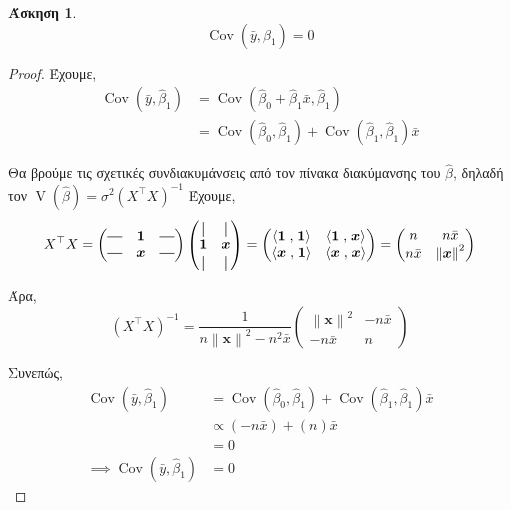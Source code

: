 \documentclass{article}
\DeclareMathOperator{\V}{\mathrm{V}}
\DeclareMathOperator{\Cov}{\mathrm{Cov}}
\newcommand{\inner}[2]{\left\langle #1 \mathrel{,} #2 \right\rangle}
\newcommand{\norm}[1]{\left\| #1 \right\|}
\newcommand{\T}[1]{{#1}^{\top}}  %
\newcommand*{\vertbar}{\rule[-1ex]{0.5pt}{2.5ex}}
\newcommand*{\horzbar}{\rule[.5ex]{2.5ex}{0.5pt}}
\newcommand{\hb}{\hat{\beta}}
\newcommand{\ve}[1]{\boldsymbol{#1}}
\newtheorem{exercise}{Άσκηση}[section]
\begin{document}
\begin{exercise} \label{ex3}
    \begin{equation*}
        \Cov(\bar{y}, \hb_1) = 0
    \end{equation*}
\end{exercise}
\begin{proof}
    Έχουμε,
    \begin{equation*}
    \begin{split}
        \Cov(\bar{y}, \hb_1) &= \Cov(\hb_0 + \hb_1 \bar{x}, \hb_1)\\
        &= \Cov(\hb_0, \hb_1) + \Cov(\hb_1, \hb_1) \bar{x}
    \end{split}
    \end{equation*}
    
Θα βρούμε τις σχετικές συνδιακυμάνσεις από τον πίνακα διακύμανσης του \(\hb\), δηλαδή τον \( \V(\hb) = \sigma^2 (\T{X} X)^{-1} \)
Έχουμε,
\begin{equation*}
    \T{X} X  =  \begin{pmatrix}
                    \horzbar & \ve{1} & \horzbar\\
                    \horzbar & \ve{x} & \horzbar
                \end{pmatrix}
                \begin{pmatrix}
                    \vertbar & \vertbar\\
                    \ve{1} & \ve{x}\\
                    \vertbar & \vertbar
                \end{pmatrix}
              = \begin{pmatrix}
                    \inner{\ve{1}}{\ve{1}} & \inner{\ve{1}}{\ve{x}}\\
                    \inner{\ve{x}}{\ve{1}} & \inner{\ve{x}}{\ve{x}}
                \end{pmatrix}
              = \begin{pmatrix}
                    n & n \bar{x}\\
                    n \bar{x} & \norm{\ve{x}}^2
                \end{pmatrix}
\end{equation*}

Άρα,
\begin{equation*}
    (\T{X} X)^{-1} = \frac{1}{n\norm{\ve{x}}^2 - n^2 \bar{x}} 
                     \begin{pmatrix}
                         \norm{\ve{x}}^2 & -n\bar{x}\\
                         -n\bar{x} & n
                     \end{pmatrix}
\end{equation*}

Συνεπώς,
\begin{align*}
    \Cov(\bar{y}, \hb_1) &= \Cov(\hb_0, \hb_1) + \Cov(\hb_1, \hb_1) \bar{x}\\
    &\propto \left( -n\bar{x} \right) + \left( n \right) \bar{x}\\
    &= 0\\
    \implies \Cov(\bar{y}, \hb_1) &= 0
\end{align*}
\end{proof}
\end{document}
